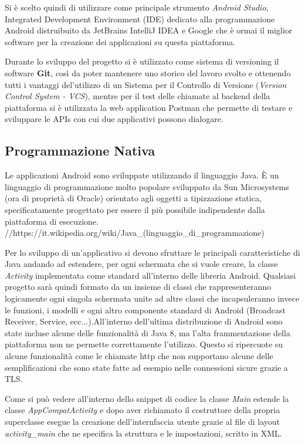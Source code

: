 Si è scelto quindi di utilizzare come principale strumento \emph{Android
Studio}, Integrated Development Environment (IDE) dedicato alla programmazione
Android distruibuito da JetBrains IntelliJ IDEA e Google che è ormai
il miglior software per la creazione dei applicazioni su questa piattaforma.
\autocite{ANDROIDDEVELOPERS:FIRSTAPP}

Durante lo sviluppo del progetto si è utilizzato come sistema di versioning
il software \textbf{Git}, così da poter mantenere uno storico del
lavoro svolto e ottenendo tutti i vantaggi del'utilizzo di un Sistema
per il Controllo di Versione (\textit{Version Control System - VCS}),
mentre per il test delle chiamate al backend della piattaforma si
è utilizzata la web application Postman \autocite{POSTMAN} che
permette di testare e sviluppare le APIs con cui due applicativi possono
dialogare.

\subsection{Programmazione Nativa}

Le applicazioni Android sono sviluppate utilizzando il linguaggio
Java. È un linguaggio di programmazione molto popolare sviluppato
da Sun Microsystems (ora di proprietà di Oracle) orientato agli oggetti
a tipizzazione statica, specificatamente progettato per essere il
più possibile indipendente dalla piattaforma di esecuzione. //https://it.wikipedia.org/wiki/Java\_(linguaggio\_di\_programmazione)

Per lo sviluppo di un'applicativo si devono sfruttare le principali
caratteristiche di Java andando ad estendere, per ogni schermata che
si vuole creare, la classe \emph{Activity }implementata come standard
all'interno delle libreria Android. Qualsiasi progetto sarà quindi
formato da un insieme di classi che rappresenteranno logicamente ogni
singola schermata unite ad altre classi che incapsuleranno invece
le funzioni, i modelli e ogni altro componente standard di Android
(Broadcast Receiver, Service, ecc...).All'interno dell'ultima distribuzione
di Android sono state incluse alcune delle funzionalità di Java 8,
ma l'alta frammentazione della piattaforma non ne permette correttamente
l'utilizzo. Questo si ripercuote su alcune funzionalità come le chiamate
http che non supportano alcune delle semplificazioni che sono state
fatte ad esempio nelle connessioni sicure grazie a TLS.

Come si può vedere all'interno dello snippet di codice la classe \emph{Main}
estende la classe \emph{AppCompatActivity }e dopo aver richiamato
il costruttore della propria superclasse esegue la creazione dell'internfaccia
utente grazie al file di layout \emph{activity\_main} che ne specifica
la struttura e le impostazioni, scritto in XML.

